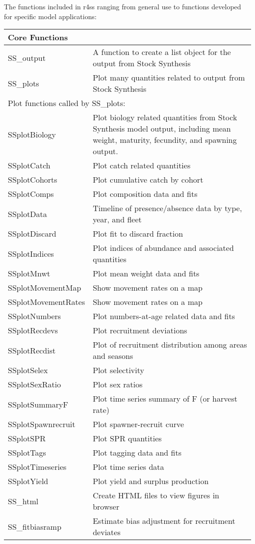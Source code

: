 \pagebreak
The functions included in r4ss ranging from general use to functions developed for specific model applications:
\begin{center}
	\begin{longtable}{p{4.5cm} p{10.52cm}}
		\hline
		Core Functions & \Tstrut\Bstrut\\
		\hline
		SS\_output \Tstrut& A function to create a list object for the output from Stock Synthesis\\
		SS\_plots  \Tstrut& Plot many quantities related to output from Stock Synthesis\\
		\hline
		
		\multicolumn{2}{l}{Plot functions called by SS\_plots:} \Tstrut\Bstrut\\
		\hline
		SSplotBiology \Tstrut& Plot biology related quantities from Stock Synthesis model output, including mean weight, maturity, fecundity, and spawning output. \\
		SSplotCatch   \Tstrut & Plot catch related quantities \\
		SSplotCohorts \Tstrut & Plot cumulative catch by cohort \\
		SSplotComps   \Tstrut & Plot composition data and fits \\
		SSplotData    \Tstrut & Timeline of presence/absence data by type, year, and fleet \\
		SSplotDiscard \Tstrut & Plot fit to discard fraction \\
		SSplotIndices \Tstrut & Plot indices of abundance and associated quantities \\
		SSplotMnwt    \Tstrut & Plot mean weight data and fits \\
		SSplotMovementMap \Tstrut & Show movement rates on a map \\
		SSplotMovementRates \Tstrut & Show movement rates on a map \\
		SSplotNumbers \Tstrut& Plot numbers-at-age related data and fits \\
		SSplotRecdevs \Tstrut& Plot recruitment deviations \\
		SSplotRecdist \Tstrut& Plot of recruitment distribution among areas and seasons \\
		SSplotSelex   \Tstrut& Plot selectivity \\
		SSplotSexRatio \Tstrut& Plot sex ratios \\
		SSplotSummaryF \Tstrut& Plot time series summary of F (or harvest rate) \\
		SSplotSpawnrecruit \Tstrut& Plot spawner-recruit curve \\
		SSplotSPR     \Tstrut& Plot SPR quantities \\
		SSplotTags    \Tstrut& Plot tagging data and fits \\
		SSplotTimeseries \Tstrut& Plot time series data \\
		SSplotYield   \Tstrut& Plot yield and surplus production \\
		SS\_html \Tstrut& Create HTML files to view figures in browser \\
		SS\_fitbiasramp \Tstrut& Estimate bias adjustment for recruitment deviates \Bstrut\\
		\hline
	

\end{longtable}
\end{center}
